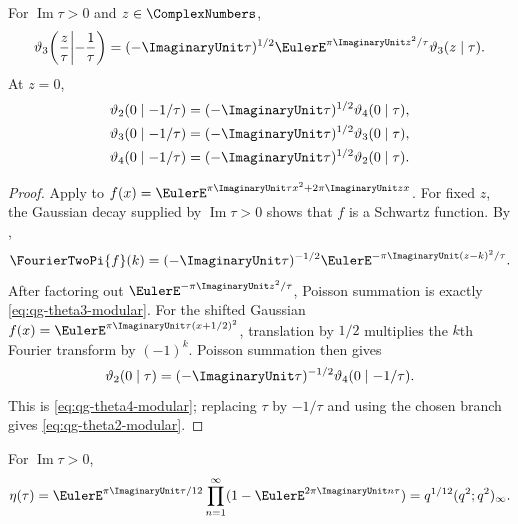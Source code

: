 \begin{theorem}
\label{qg:thm-jacobi-imaginary}
For $\operatorname{Im}\tau>0$ and $z\in\ComplexNumbers$,
\begin{equation}
 \vartheta_3\!\left(\frac z\tau\middle|-\frac1\tau\right)
 =(-\ImaginaryUnit\tau)^{1/2}
  \EulerE^{\pi\ImaginaryUnit z^2/\tau}\vartheta_3(z\mid\tau).
\label{eq:qg-theta3-modular}
\end{equation}
At $z=0$,
\begin{align}
 \vartheta_2(0\mid-1/\tau)
  &=(-\ImaginaryUnit\tau)^{1/2}\vartheta_4(0\mid\tau),
 \label{eq:qg-theta2-modular}\\
 \vartheta_3(0\mid-1/\tau)
  &=(-\ImaginaryUnit\tau)^{1/2}\vartheta_3(0\mid\tau),
 \label{eq:qg-theta3-null-modular}\\
 \vartheta_4(0\mid-1/\tau)
  &=(-\ImaginaryUnit\tau)^{1/2}\vartheta_2(0\mid\tau).
 \label{eq:qg-theta4-modular}
\end{align}
\end{theorem}

\begin{proof}
Apply  to
$f(x)=\EulerE^{\pi\ImaginaryUnit\tau x^2+2\pi\ImaginaryUnit zx}$.
For fixed $z$, the Gaussian decay supplied by $\operatorname{Im}\tau>0$
shows that $f$ is a Schwartz function.
By ,
\[
 \FourierTwoPi{f}(k)=(-\ImaginaryUnit\tau)^{-1/2}
 \EulerE^{-\pi\ImaginaryUnit(z-k)^2/\tau}.
\]
After factoring out
$\EulerE^{-\pi\ImaginaryUnit z^2/\tau}$, Poisson summation is exactly
\eqref{eq:qg-theta3-modular}.  For the shifted Gaussian
$f(x)=\EulerE^{\pi\ImaginaryUnit\tau(x+1/2)^2}$, translation by $1/2$
multiplies the $k$th Fourier transform by $(-1)^k$.  Poisson summation then
gives
\[
 \vartheta_2(0\mid\tau)
 =(-\ImaginaryUnit\tau)^{-1/2}\vartheta_4(0\mid-1/\tau).
\]
This is \eqref{eq:qg-theta4-modular}; replacing $\tau$ by $-1/\tau$
and using the chosen branch gives \eqref{eq:qg-theta2-modular}.
\end{proof}

\begin{definition}
\label{qg:def-dedekind-eta}
For $\operatorname{Im}\tau>0$,
\begin{equation}
 \eta(\tau)=\EulerE^{\pi\ImaginaryUnit\tau/12}
 \prod_{n=1}^{\infty}(1-\EulerE^{2\pi\ImaginaryUnit n\tau})
 =q^{1/12}(q^2;q^2)_\infty.
\label{eq:qg-eta-definition}
\end{equation}
\end{definition}

